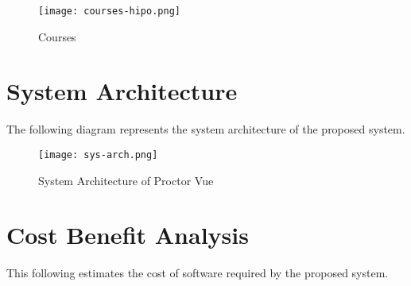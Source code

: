 \vspace{1cm}

\begin{figure}[h!]
    \begin{center}
        \texttt{[image: courses-hipo.png]}
        \caption{Courses}
    \end{center}
\end{figure}

\section{System Architecture}
The following diagram represents the system architecture of the proposed system.

\begin{figure}[h!]
    \begin{center}
        \texttt{[image: sys-arch.png]}
        \caption{System Architecture of Proctor Vue}
    \end{center}
\end{figure}

\section{Cost Benefit Analysis}

This following estimates the cost of software required by the proposed system.



